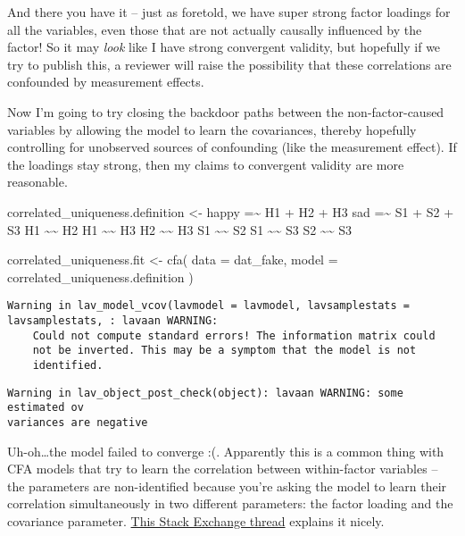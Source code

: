 \documentclass[
  letterpaper,
  DIV=11,
  numbers=noendperiod]{scrreprt}
\newenvironment{Shaded}{\begin{snugshade}}{\end{snugshade}}
\newcommand{\AttributeTok}[1]{\textcolor[rgb]{0.40,0.45,0.13}{#1}}
\newcommand{\FunctionTok}[1]{\textcolor[rgb]{0.28,0.35,0.67}{#1}}
\newcommand{\NormalTok}[1]{\textcolor[rgb]{0.00,0.23,0.31}{#1}}
\newcommand{\OtherTok}[1]{\textcolor[rgb]{0.00,0.23,0.31}{#1}}
\newcommand{\StringTok}[1]{\textcolor[rgb]{0.13,0.47,0.30}{#1}}
\begin{document}
And there you have it -- just as foretold, we have super strong factor
loadings for all the variables, even those that are not actually
causally influenced by the factor! So it may \emph{look} like I have
strong convergent validity, but hopefully if we try to publish this, a
reviewer will raise the possibility that these correlations are
confounded by measurement effects.

Now I'm going to try closing the backdoor paths between the
non-factor-caused variables by allowing the model to learn the
covariances, thereby hopefully controlling for unobserved sources of
confounding (like the measurement effect). If the loadings stay strong,
then my claims to convergent validity are more reasonable.

\begin{Shaded}
\begin{Highlighting}[]
\NormalTok{correlated\_uniqueness.definition }\OtherTok{\textless{}{-}} 
  \StringTok{\textquotesingle{}happy =\textasciitilde{} H1 + H2 + H3}
\StringTok{   sad   =\textasciitilde{} S1 + S2 + S3}
\StringTok{   }
\StringTok{   H1 \textasciitilde{}\textasciitilde{} H2}
\StringTok{   H1 \textasciitilde{}\textasciitilde{} H3}
\StringTok{   H2 \textasciitilde{}\textasciitilde{} H3}
\StringTok{   S1 \textasciitilde{}\textasciitilde{} S2}
\StringTok{   S1 \textasciitilde{}\textasciitilde{} S3}
\StringTok{   S2 \textasciitilde{}\textasciitilde{} S3}
\StringTok{   \textquotesingle{}}

\NormalTok{correlated\_uniqueness.fit }\OtherTok{\textless{}{-}} \FunctionTok{cfa}\NormalTok{(}
  \AttributeTok{data =}\NormalTok{ dat\_fake,}
  \AttributeTok{model =}\NormalTok{ correlated\_uniqueness.definition}
\NormalTok{)}
\end{Highlighting}
\end{Shaded}

\begin{verbatim}
Warning in lav_model_vcov(lavmodel = lavmodel, lavsamplestats = lavsamplestats, : lavaan WARNING:
    Could not compute standard errors! The information matrix could
    not be inverted. This may be a symptom that the model is not
    identified.
\end{verbatim}

\begin{verbatim}
Warning in lav_object_post_check(object): lavaan WARNING: some estimated ov
variances are negative
\end{verbatim}

Uh-oh\ldots the model failed to converge :(. Apparently this is a common
thing with CFA models that try to learn the correlation between
within-factor variables -- the parameters are non-identified because
you're asking the model to learn their correlation simultaneously in two
different parameters: the factor loading and the covariance parameter.
\href{https://stackoverflow.com/questions/44114501/model-identification-in-lavaan-for-r}{This
Stack Exchange thread} explains it nicely.
\end{document}
